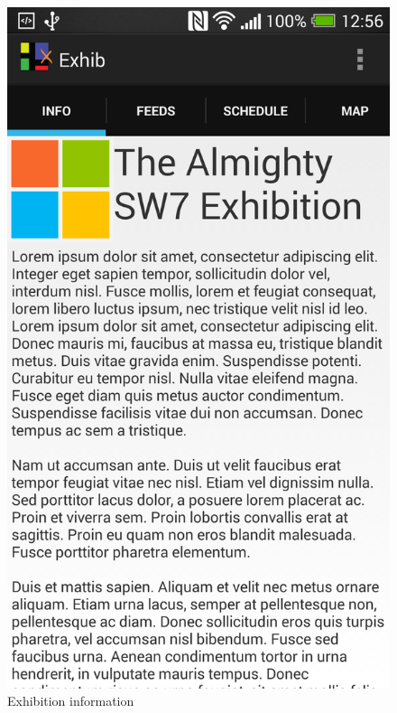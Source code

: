 \begin{figure}[H]
\begin{minipage}[b]{0.5\columnwidth}
\centering
\includegraphics[width=\columnwidth]{img/finaldesign/infoscreen.png}
\caption{Exhibition information}
\label{fig:infoscreen}
\end{minipage}
\hspace{0.5cm}
\begin{minipage}[b]{0.5\columnwidth}
\centering

\end{minipage}
\end{figure}
